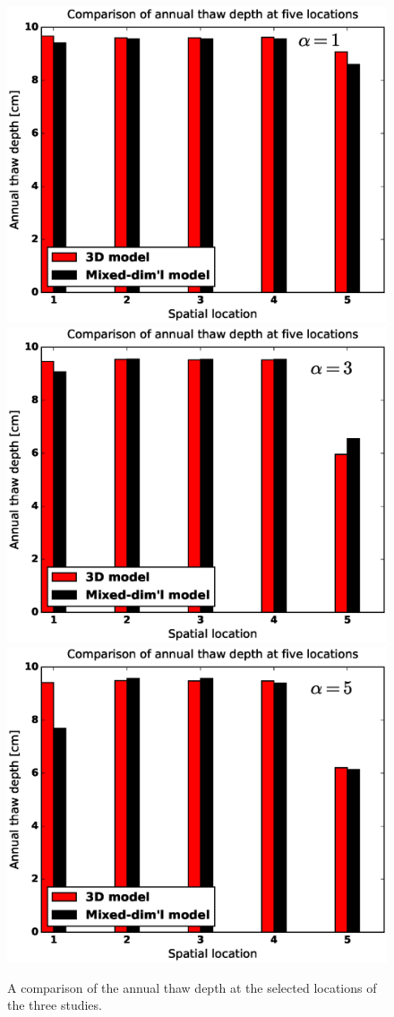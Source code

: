 \documentclass[review]{elsarticle}
\begin{document}
\begin{figure}[!htpb]
\centering
\includegraphics[height = 6.cm, width=10.cm]{figures/comparison/annual-thaw-depth/annual_depth-1.eps}
\includegraphics[height = 6.cm, width=10.cm]{figures/comparison/annual-thaw-depth/annual_depth-3.eps}
\includegraphics[height = 6.cm, width=10.cm]{figures/comparison/annual-thaw-depth/annual_depth-5.eps}
\caption{A comparison of the annual thaw depth at the selected locations of the three studies.}
\label{thaw-depth}
\end{figure}
\end{document}
